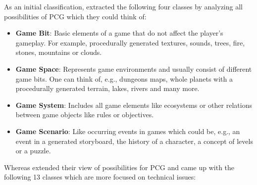 \documentclass[MGS,Master,english]{twbook}%
\begin{document}
As an initial classification, \citep{pcg::survey} extracted the following four classes by analyzing all possibilities of PCG which they could think of:
\begin{itemize}
	\item \textbf{Game Bit}: Basic elements of a game that do not affect the player's gameplay. For example, procedurally generated textures, sounds, trees, fire, stones, mountains or clouds. \cite{pcg::survey}
	\item \textbf{Game Space}: Represents game environments and usually consist of different game bits. One can think of, e.g., dungeons maps, whole planets with a procedurally generated terrain, lakes, rivers and many more. \cite{pcg::survey}
	\item \textbf{Game System}: Includes all game elements like ecosystems or other relations between game objects like rules or objectives. \cite{pcg::survey}
	\item \textbf{Game Scenario}: Like occurring events in games which could be, e.g., an event in a generated storyboard, the history of a character, a concept of levels or a puzzle. \cite{pcg::survey}
\end{itemize}
Whereas \citep{pcg::book} extended their view of possibilities for PCG and came up with the following 13 classes which are more focused on technical issues:
\end{document}
